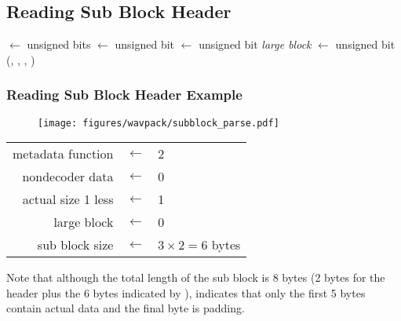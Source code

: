 
\clearpage

\subsection{Reading Sub Block Header}
\METAFUNC $\leftarrow$  unsigned bits\;
\NONDECODER $\leftarrow$  unsigned bit\;
\ACTUALSIZEONELESS $\leftarrow$  unsigned bit\;
\textit{large block} $\leftarrow$  unsigned bit\;
\Return (\METAFUNC , \NONDECODER , \ACTUALSIZEONELESS , \SUBBLOCKSIZE)\;
\EALGORITHM

\subsubsection{Reading Sub Block Header Example}
\begin{figure}[h]
\texttt{[image: figures/wavpack/subblock\_parse.pdf]}
\end{figure}
\begin{table}[h]
\begin{tabular}{r>{$}c<{$}l}
metadata function & \leftarrow & 2 \\
nondecoder data & \leftarrow & 0 \\
actual size 1 less & \leftarrow & 1 \\
large block & \leftarrow & 0 \\
sub block size & \leftarrow & $3 \times 2 = 6$ bytes\;
\end{tabular}
\end{table}
\par
\noindent
Note that although the total length of the sub block is
8 bytes (2 bytes for the header plus the 6 bytes indicated by
),
 indicates that only the first 5 bytes
contain actual data and the final byte is padding.

